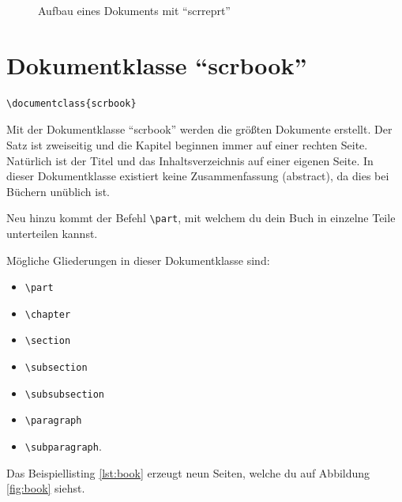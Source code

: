\begin{figure}[htb]
\begin{center}
	\end{center}
	\caption{Aufbau eines Dokuments mit \enquote{scrreprt}}
	\label{fig:report}
\end{figure}


\section{Dokumentklasse \enquote{scrbook}}

\begin{lstlisting}
\documentclass{scrbook}
\end{lstlisting}

Mit der Dokumentklasse \enquote{scrbook} werden die größten Dokumente erstellt. Der Satz ist zweiseitig und die Kapitel beginnen immer auf einer rechten Seite. Natürlich ist der Titel und das Inhaltsverzeichnis auf einer eigenen Seite. In dieser Dokumentklasse existiert keine Zusammenfassung (abstract), da dies bei Büchern unüblich ist. 

Neu hinzu kommt der Befehl \texttt{\textbackslash part}, mit welchem du dein Buch in einzelne Teile unterteilen kannst.

Mögliche Gliederungen in dieser Dokumentklasse sind:
\begin{itemize}
	\item \texttt{\textbackslash part}
	\item \texttt{\textbackslash chapter}
	\item \texttt{\textbackslash section}
	\item \texttt{\textbackslash subsection}
	\item \texttt{\textbackslash subsubsection}
	\item \texttt{\textbackslash paragraph}
	\item \texttt{\textbackslash subparagraph}.
\end{itemize}

Das Beispiellisting \ref{lst:book} erzeugt neun Seiten, welche du auf Abbildung \ref{fig:book} siehst.

